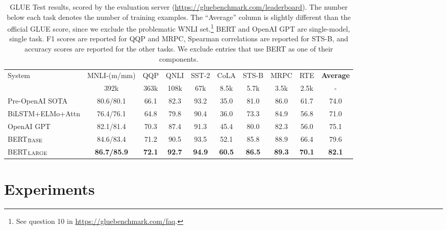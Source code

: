 \documentclass[11pt,a4paper]{article}
\newcommand\bertbase{BERT$_{\small \textsc{BASE}}$\xspace}
\newcommand\bertlarge{BERT$_{\small \textsc{LARGE}}$\xspace}
\begin{document}
\begin{table}[t]
\small
\renewcommand{\arraystretch}{1.2}
\begin{center}
 \begin{tabular*}{\textwidth}{l@{\extracolsep{\fill}}cccccccc c}
    \toprule
System             &  MNLI-(m/mm)    & QQP        & QNLI       & SST-2      & CoLA       & STS-B      & MRPC       & RTE        & {\bf Average} \\
                  & 392k            & 363k       & 108k       & 67k        & 8.5k       & 5.7k       & 3.5k       & 2.5k       & -          \\ 
\hline
Pre-OpenAI SOTA    & 80.6/80.1       & 66.1       & 82.3       & 93.2       & 35.0       & 81.0       & 86.0       & 61.7       & 74.0       \\
BiLSTM+ELMo+Attn   & 76.4/76.1       & 64.8       & 79.8       & 90.4       & 36.0       & 73.3       & 84.9       & 56.8       & 71.0       \\
OpenAI GPT         & 82.1/81.4       & 70.3       & 87.4       & 91.3       & 45.4       & 80.0       & 82.3       & 56.0       & 75.1       \\

\hline
\bertbase          & 84.6/83.4       & 71.2       & 90.5       & 93.5       & 52.1       & 85.8       & 88.9       & 66.4       & 79.6       \\
\bertlarge         & {\bf 86.7/85.9} & {\bf 72.1} & {\bf 92.7} & {\bf 94.9} & {\bf 60.5} & {\bf 86.5} & {\bf 89.3} & {\bf 70.1} & {\bf 82.1} \\
    \bottomrule
   \end{tabular*}
   \caption{GLUE Test results, scored by the evaluation server ({\small \url{https://gluebenchmark.com/leaderboard}}). The number below each task denotes the number of training examples. The ``Average'' column is slightly different than the official GLUE score, since we exclude the problematic WNLI set.\footnote{See question 10 in \url{https://gluebenchmark.com/faq}.} 
   BERT and OpenAI GPT are single-model, single task. F1 scores are reported for QQP and MRPC, Spearman correlations are reported for STS-B, and accuracy scores are reported for
   the other tasks. We exclude entries that use BERT as one of their components.}
   \label{tab:glue_official}
\end{center}
\end{table}
\section{Experiments}
\label{sec:experiments}
\end{document}
